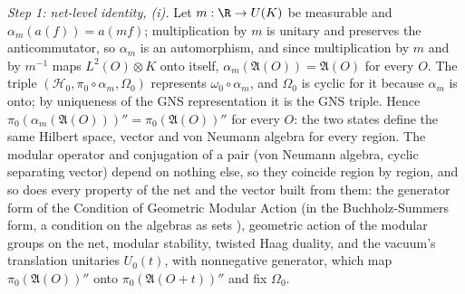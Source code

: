 \emph{Step 1: net-level identity, (i).} Let $m : \R \to U(K)$ be measurable and $\alpha_{m}(a(f)) = a(mf)$; multiplication by $m$ is unitary and preserves the anticommutator, so $\alpha_{m}$ is an automorphism, and since multiplication by $m$ and by $m^{-1}$ maps $L^{2}(O)\otimes K$ onto itself, $\alpha_{m}(\mathfrak{A}(O)) = \mathfrak{A}(O)$ for every $O$. The triple $(\mathcal{H}_{0}, \pi_{0}\circ\alpha_{m}, \Omega_{0})$ represents $\omega_{0}\circ\alpha_{m}$, and $\Omega_{0}$ is cyclic for it because $\alpha_{m}$ is onto; by uniqueness of the GNS representation it is the GNS triple. Hence $\pi_{0}(\alpha_{m}(\mathfrak{A}(O)))'' = \pi_{0}(\mathfrak{A}(O))''$ for every $O$: the two states define the same Hilbert space, vector and von Neumann algebra for every region. The modular operator and conjugation of a pair (von Neumann algebra, cyclic separating vector) depend on nothing else, so they coincide region by region, and so does every property of the net and the vector built from them: the generator form of the Condition of Geometric Modular Action (in the Buchholz-Summers form, a condition on the algebras as sets \cite{BuchholzFlorigSummers1999, BuchholzSummers1993}), geometric action of the modular groups on the net, modular stability, twisted Haag duality, and the vacuum's translation unitaries $U_{0}(t)$, with nonnegative generator, which map $\pi_{0}(\mathfrak{A}(O))''$ onto $\pi_{0}(\mathfrak{A}(O + t))''$ and fix $\Omega_{0}$.


